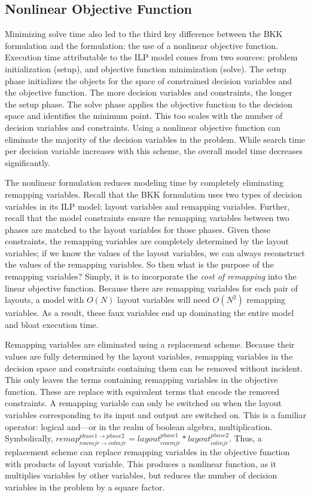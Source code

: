 \subsection{Nonlinear Objective Function}

Minimizing solve time also led to the third key difference between the BKK formulation and the \FormatDecisions{} formulation: the use of a nonlinear objective function.
Execution time attributable to the ILP model comes from two sources: problem initialization (setup), and objective function minimization (solve).
The setup phase initializes the objects for the space of constrained decision variables and the objective function.
The more decision variables and constraints, the longer the setup phase.
The solve phase applies the objective function to the decision space and identifies the minimum point.
This too scales with the number of decision variables and constraints.
Using a nonlinear objective function can eliminate the majority of the decision variables in the problem.
While search time per decision variable increases with this scheme, the overall model time decreases significantly.

The nonlinear formulation reduces modeling time by completely eliminating remapping variables.
Recall that the BKK formulation uses two types of decision variables in its ILP model: layout variables and remapping variables.
Further, recall that the model constraints ensure the remapping variables between two phases are matched to the layout variables for those phases.
Given these constraints, the remapping variables are completely determined by the layout variables; 
if we know the values of the layout variables, we can always reconstruct the values of the remapping variables.
So then what is the purpose of the remapping variables? 
Simply, it is to incorporate the \textit{cost of remapping} into the linear objective function.
Because there are remapping variables for each pair of layouts, a model with $O(N)$ layout variables will need $O(N^2)$ remapping variables.
As a result, these faux variables end up dominating the entire model and bloat execution time.

Remapping variables are eliminated using a replacement scheme. 
Because their values are fully determined by the layout variables, remapping variables in the decision space and constraints containing them can be removed without incident.
This only leaves the terms containing remapping variables in the objective function.
These are replace with equivalent terms that encode the removed constraints.
A remapping variable can only be switched on when the layout variables corresponding to its input and output are switched on.
This is a familiar operator: logical and––or in the realm of boolean algebra, multiplication.
Symbolically, $remap_{rowmjr \rightarrow colmjr}^{phase1 \rightarrow phase2} = layout_{rowmjr}^{phase1} * layout_{colmjr}^{phase2}$.
Thus, a replacement scheme can replace remapping variables in the objective function with products of layout variable.
This produces a nonlinear function, as it multiplies variables by other variables, but reduces the number of decision variables in the problem by a square factor.



